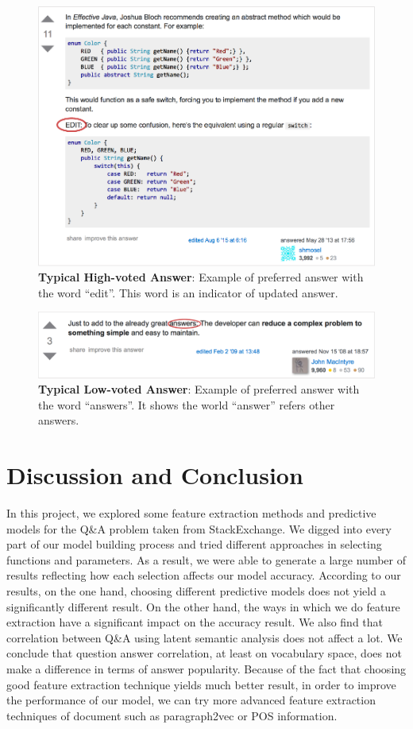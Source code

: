 \documentclass[11pt]{article}
\begin{document}
\begin{figure}[t]
    \centering
	\includegraphics[width=0.98\columnwidth]{edit.pdf}
    \caption{{\bf Typical High-voted Answer}: Example of preferred answer with the word ``edit''. This word is an indicator of updated answer. }
    \label{fig:edit}
\end{figure}

\begin{figure}[t]
    \centering
	\includegraphics[width=0.98\columnwidth]{answers.pdf}
    \caption{{\bf Typical Low-voted Answer}: Example of preferred answer with the word ``answers''. It shows the world ``answer'' refers other answers.}
    \label{fig:answers}
\end{figure}

\section{Discussion and Conclusion}
In this project, we explored some feature extraction methods and predictive models for the Q\&A problem taken from StackExchange. We digged into every part of our model building process and tried different approaches in selecting functions and parameters. As a result, we were able to generate a large number of results reflecting how each selection affects our model accuracy. According to our results, on the one hand, choosing different predictive models does not yield a significantly different result. On the other hand, the ways in which we do feature extraction have a significant impact on the accuracy result. We also find that correlation between Q\&A using latent semantic analysis does not affect a lot. We conclude that question answer correlation, at least on vocabulary space, does not  make a difference in terms of answer popularity. Because of the fact that choosing good feature extraction technique yields much better result, in order to improve the performance of our model, we can try more advanced feature extraction techniques of document such as paragraph2vec or POS information. 
\end{document}
